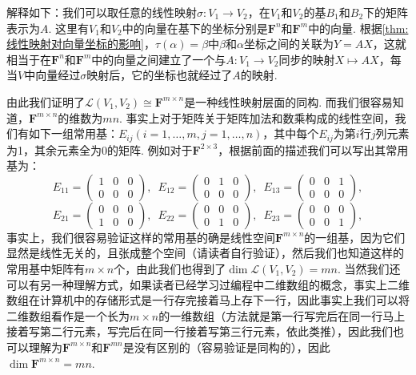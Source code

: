 解释如下：我们可以取任意的线性映射$\sigma:V_1\to V_2$，在$V_1$和$V_2$的基$B_1$和$B_2$下的矩阵表示为$A$. 这里有$V_1$和$V_2$中的向量在基下的坐标分别是$\mathbf{F}^n$和$\mathbf{F}^m$中的向量. 根据\autoref{thm:线性映射对向量坐标的影响}，$\tau(\alpha)=\beta$中$\beta$和$\alpha$坐标之间的关联为$Y=AX$，这就相当于在$\mathbf{F}^n$和$\mathbf{F}^m$中的向量之间建立了一个与$A:V_1\to V_2$同步的映射$X\mapsto AX$，每当$V$中向量经过$\sigma$映射后，它的坐标也就经过了$A$的映射.

由此我们证明了$\mathcal{L}(V_1,V_2)\cong\mathbf{F}^{m\times n}$是一种线性映射层面的同构. 而我们很容易知道，$\mathbf{F}^{m\times n}$的维数为$mn$. 事实上对于矩阵关于矩阵加法和数乘构成的线性空间，我们有如下一组常用基：$E_{ij}(i=1,\ldots,m,j=1,\ldots,n)$，其中每个$E_{ij}$为第$i$行$j$列元素为1，其余元素全为0的矩阵. 例如对于$\mathbf{F}^{2\times 3}$，根据前面的描述我们可以写出其常用基为：
\[E_{11}=\begin{pmatrix}
        1 & 0 & 0 \\
        0 & 0 & 0
    \end{pmatrix},\enspace E_{12}=\begin{pmatrix}
        0 & 1 & 0 \\
        0 & 0 & 0
    \end{pmatrix},\enspace E_{13}=\begin{pmatrix}
        0 & 0 & 1 \\
        0 & 0 & 0
    \end{pmatrix},\]
\[E_{21}=\begin{pmatrix}
        0 & 0 & 0 \\
        1 & 0 & 0
    \end{pmatrix},\enspace E_{22}=\begin{pmatrix}
        0 & 0 & 0 \\
        0 & 1 & 0
    \end{pmatrix},\enspace E_{23}=\begin{pmatrix}
        0 & 0 & 0 \\
        0 & 0 & 1
    \end{pmatrix},\]
事实上，我们很容易验证这样的常用基的确是线性空间$\mathbf{F}^{m\times n}$的一组基，因为它们显然是线性无关的，且张成整个空间（请读者自行验证），然后我们也知道这样的常用基中矩阵有$m\times n$个，由此我们也得到了$\dim\mathcal{L}(V_1,V_2)=mn$. 当然我们还可以有另一种理解方式，如果读者已经学习过编程中二维数组的概念，事实上二维数组在计算机中的存储形式是一行存完接着马上存下一行，因此事实上我们可以将二维数组看作是一个长为$m\times n$的一维数组（方法就是第一行写完后在同一行马上接着写第二行元素，写完后在同一行接着写第三行元素，依此类推），因此我们也可以理解为$\mathbf{F}^{m\times n}$和$\mathbf{F}^{mn}$是没有区别的（容易验证是同构的），因此$\dim\mathbf{F}^{m\times n}=mn$.


